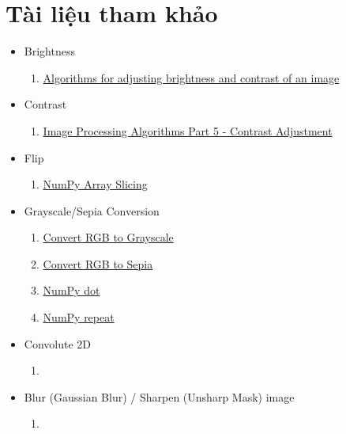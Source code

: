 \documentclass[]{article}
\begin{document}
\section{Tài liệu tham khảo}
\begin{itemize}
  \item Brightness
  \begin{enumerate}
    \item \href{https://ie.nitk.ac.in/blog/2020/01/19/algorithms-for-adjusting-brightness-and-contrast-of-an-image/}{Algorithms for adjusting brightness and contrast of an image}
  \end{enumerate}
  \item Contrast
  \begin{enumerate}
      \item \href{https://www.dfstudios.co.uk/articles/programming/image-programming-algorithms/image-processing-algorithms-part-5-contrast-adjustment/}{Image Processing Algorithms Part 5 - Contrast Adjustment}
  \end{enumerate}
  \item Flip
  \begin{enumerate}
      \item \href{https://www.w3schools.com/python/numpy/numpy_array_slicing.asp}{NumPy Array Slicing}
  \end{enumerate}
  \item Grayscale/Sepia Conversion
  \begin{enumerate}
    \item \href{https://www.tutorialspoint.com/dip/grayscale_to_rgb_conversion.htm}{Convert RGB to Grayscale}
    \item \href{https://www.geeksforgeeks.org/image-processing-in-java-colored-image-to-sepia-image-conversion/}{Convert RGB to Sepia}
    \item \href{https://numpy.org/doc/stable/reference/generated/numpy.dot.html}{NumPy dot}
    \item \href{https://numpy.org/doc/stable/reference/generated/numpy.repeat.html}{NumPy repeat}
  \end{enumerate}
  \item Convolute 2D
  \begin{enumerate}
    \item 
  \end{enumerate}
  \item Blur (Gaussian Blur) / Sharpen (Unsharp Mask) image
  \begin{enumerate}
    \item 

\end{enumerate}
\end{itemize}
\end{document}
